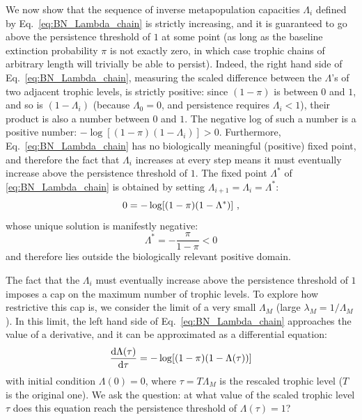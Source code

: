 \documentclass[11pt]{article}
\newcommand{\ud}{\text{d}}
\let\originalleft\left
\let\originalright\right
\renewcommand{\left}{\mathopen{}\mathclose\bgroup\originalleft}
\renewcommand{\right}{\aftergroup\egroup\originalright}
\begin{document}
We now show that the sequence of inverse metapopulation capacities $\Lambda_i$ defined by Eq.~\ref{eq:BN_Lambda_chain} is strictly increasing, and it is guaranteed to go above the persistence threshold of $1$ at some point (as long as the baseline extinction probability $\pi$ is not exactly zero, in which case trophic chains of arbitrary length will trivially be able to persist). Indeed, the right hand side of Eq.~\ref{eq:BN_Lambda_chain}, measuring the scaled difference between the $\Lambda$'s of two adjacent trophic levels, is strictly positive: since $(1-\pi)$ is between $0$ and $1$, and so is $(1-\Lambda_i)$ (because $\Lambda_0 = 0$, and persistence requires $\Lambda_i < 1$), their product is also a number between $0$ and $1$. The negative log of such a number is a positive number: $-\log[(1-\pi)(1-\Lambda_i)] > 0$. Furthermore, Eq.~\ref{eq:BN_Lambda_chain} has no biologically meaningful (positive) fixed point, and therefore the fact that $\Lambda_i$ increases at every step means it must eventually increase above the persistence threshold of $1$. The fixed point $\Lambda^*$ of \ref{eq:BN_Lambda_chain} is obtained by setting $\Lambda_{i+1} = \Lambda_i = \Lambda^*$:
\begin{equation}
  \label{eq:BN_Lambda_chain_fp}
  0 = - \log \left[ (1 - \pi) (1-\Lambda^*) \right] \ ,
\end{equation}
whose unique solution is manifestly negative:
\begin{equation}
  \label{eq:BN_Lambda_chain_fp_sol}
  \Lambda^* = - \frac{\pi}{1 - \pi} < 0
\end{equation}
and therefore lies outside the biologically relevant positive domain.

The fact that the $\Lambda_i$ must eventually increase above the persistence threshold of $1$ imposes a cap on the maximum number of trophic levels. To explore how restrictive this cap is, we consider the limit of a very small $\Lambda_M$ (large $\lambda_M = 1/\Lambda_M$). In this limit, the left hand side of Eq.~\ref{eq:BN_Lambda_chain} approaches the value of a derivative, and it can be approximated as a differential equation:
\begin{equation}
  \label{eq:BN_lambda_chain_11}
  \frac{\ud \Lambda(\tau)}{\ud \tau} =
  - \log \left[ (1 - \pi) (1 - \Lambda(\tau)) \right]
\end{equation}
with initial condition $\Lambda(0) = 0$, where $\tau = T \Lambda_M$ is the rescaled trophic level ($T$ is the original one). We ask the question: at what value of the scaled trophic level $\tau$ does this equation reach the persistence threshold of $\Lambda(\tau) = 1$?
\end{document}
